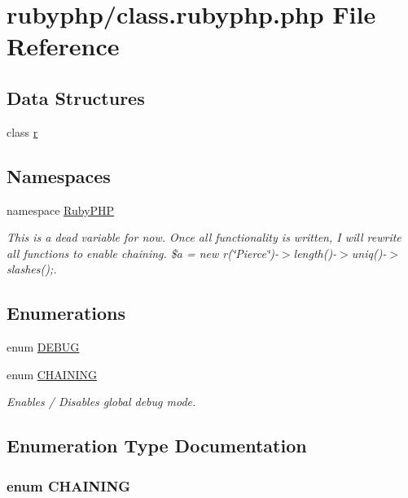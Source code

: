 \hypertarget{class_8rubyphp_8php}{\section{rubyphp/class.rubyphp.\-php File Reference}
\label{class_8rubyphp_8php}
}
\subsection*{Data Structures}
\begin{DoxyCompactItemize}
\item 
class \hyperlink{classr}{r}
\end{DoxyCompactItemize}
\subsection*{Namespaces}
\begin{DoxyCompactItemize}
\item 
namespace \hyperlink{namespace_ruby_p_h_p}{Ruby\-P\-H\-P}
\begin{DoxyCompactList}\small\item\em This is a dead variable for now. Once all functionality is written, I will rewrite all functions to enable chaining. \$a = new r(\char`\"{}\-Pierce\char`\"{})-\/$>$length()-\/$>$uniq()-\/$>$slashes();. \end{DoxyCompactList}\end{DoxyCompactItemize}
\subsection*{Enumerations}
\begin{DoxyCompactItemize}
\item 
enum \hyperlink{class_8rubyphp_8php_a73585d7121de037cf2e2ca12b27eb83e}{D\-E\-B\-U\-G} 
\item 
enum \hyperlink{class_8rubyphp_8php_a2ef56c4551609dbec9cf98bd6008f646}{C\-H\-A\-I\-N\-I\-N\-G} 
\begin{DoxyCompactList}\small\item\em Enables / Disables global debug mode. \end{DoxyCompactList}\end{DoxyCompactItemize}


\subsection{Enumeration Type Documentation}
\hypertarget{class_8rubyphp_8php_a2ef56c4551609dbec9cf98bd6008f646}{
\subsubsection[{C\-H\-A\-I\-N\-I\-N\-G}]{\setlength{\rightskip}{0pt plus 5cm}enum {\bf C\-H\-A\-I\-N\-I\-N\-G}}}\label{class_8rubyphp_8php_a2ef56c4551609dbec9cf98bd6008f646}


